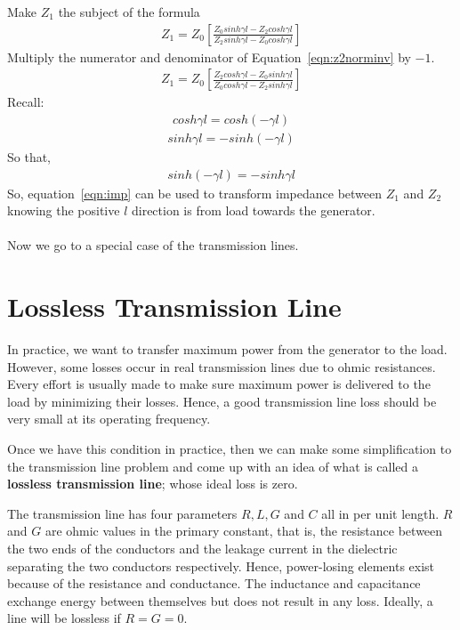 Make $Z_1$ the subject of the formula
\begin{align}
Z_1 = Z_0\left[\frac{Z_0sinh\gamma l - Z_2cosh\gamma l}{Z_2sinh\gamma l - Z_0cosh\gamma l}\right]
\label{eqn:z2norminv}
\end{align}
Multiply the numerator and denominator of Equation~\ref{eqn:z2norminv} by $-1$.
\begin{align*}
Z_1 = Z_0\left[\frac{Z_2cosh\gamma l - Z_0sinh\gamma l}{Z_0cosh\gamma l - Z_2sinh\gamma l}\right]
\end{align*}
Recall:
\begin{align*}
cosh\gamma l = cosh(-\gamma l)
\end{align*}
\begin{align*}
sinh\gamma l = -sinh(-\gamma l)
\end{align*}
So that,
\begin{align*}
sinh(-\gamma l) = -sinh\gamma l
\end{align*}
So, equation~\ref{eqn:imp} can be used to transform impedance between $Z_1$ and $Z_2$ knowing the positive $l$ direction is from load towards the generator.\\\\
Now we go to a special case of the transmission lines.

\section{Lossless Transmission Line}

In practice, we want to transfer maximum power from the generator to the load. However, some losses occur in real transmission lines due to ohmic resistances. Every effort is usually made to make sure maximum power is delivered to the load by minimizing their losses. Hence, a good transmission line loss should be very small at its operating frequency. 

Once we have this condition in practice, then we can make some simplification to the transmission line problem and come up with an idea of what is called a \textbf{lossless transmission line}; whose ideal loss is zero.

The transmission line has four parameters $R, L, G$ and $C$ all in per unit length. $R$ and $G$ are ohmic values in the primary constant, that is, the resistance between the two ends of the conductors and the leakage current in the dielectric separating the two conductors respectively. Hence, power-losing elements exist because of the resistance and conductance. The inductance and capacitance exchange energy between themselves but does not result in any loss. Ideally, a line will be lossless if $R = G = 0$.\\

